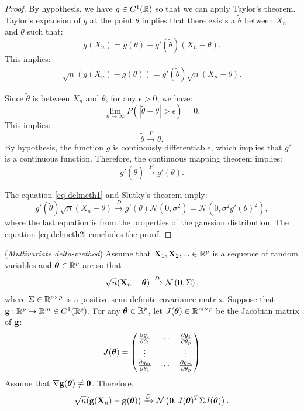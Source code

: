 \documentclass{article}
\begin{document}
\begin{proof}
By hypothesis, we have $g\in C^1(\mathbb{R})$ so that we can apply Taylor's theorem. 
Taylor's expansion of $g$ at the point $\theta$ implies that there exists a $\tilde{\theta}$ between 
$X_n$ and $\theta$ such that:
$$
g(X_n) = g(\theta) + g'\left(\tilde{\theta}\right)(X_n-\theta).
$$
This implies:
\begin{align}
\label{eq-delmeth2}
\sqrt{n} (g(X_n) - g(\theta)) = g'\left(\tilde{\theta}\right) \sqrt{n} (X_n-\theta).
\end{align}

Since $\tilde{\theta}$ is between $X_n$ and $\theta$, for any $\epsilon>0$, we have:
$$
\lim_{n\rightarrow \infty} P(|\tilde{\theta} - \theta|>\epsilon)=0.
$$
This implies:
$$
\tilde{\theta} \xrightarrow{P} \theta.
$$
By hypothesis, the function $g$ is continously differentiable, which implies that $g'$ is a 
continuous function. 
Therefore, the continuous mapping theorem implies:
$$
g'\left(\tilde{\theta}\right) \xrightarrow{P} g'(\theta).
$$

The equation \ref{eq-delmeth1} and Slutky's theorem imply:
$$
g'\left(\tilde{\theta}\right) \sqrt{n} (X_n-\theta) 
\xrightarrow{D} g'(\theta) \mathcal{N}(0,\sigma^2) = \mathcal{N}(0,\sigma^2 g'(\theta)^2),
$$
where the last equation is from the properties of the gaussian 
distribution. 
The equation \ref{eq-delmeth2} concludes the proof.
\end{proof}


\begin{theorem}
\label{eq-multivdelmeth1}
(\emph{Multivariate delta-method})
Assume that ${\bf X}_1,{\bf X}_2,... \in\mathbb{R}^p$ is a sequence of random variables 
and $\boldsymbol{\theta}\in\mathbb{R}^p$ are so that 
\begin{align}
\label{eq-multivdelmeth1}
\sqrt{n} ({\bf X}_n - \boldsymbol{\theta}) \xrightarrow{D} \mathcal{N}\left({\bf 0},\Sigma\right),
\end{align}
where $\Sigma\in\mathbb{R}^{p\times p}$ is a positive semi-definite covariance matrix. 
Suppose that ${\bf g}:\mathbb{R}^p \rightarrow \mathbb{R}^m \in C^1(\mathbb{R}^p)$. 
For any $\boldsymbol{\theta}\in\mathbb{R}^p$, let $J(\boldsymbol{\theta})\in\mathbb{R}^{m\times p}$ be the Jacobian matrix of ${\bf g}$:
$$
J(\boldsymbol{\theta}) = 
\begin{pmatrix}
\frac{\partial g_1}{\partial \theta_1} & 
\cdots &
\frac{\partial g_1}{\partial \theta_p} \\
\vdots &    & \vdots \\
\frac{\partial g_m}{\partial \theta_1} & 
\cdots &
\frac{\partial g_m}{\partial \theta_p} 
\end{pmatrix} 
$$
Assume that $\nabla {\bf g}(\boldsymbol{\theta})\neq {\bf 0}$. 
Therefore, 
$$
\sqrt{n} ({\bf g}({\bf X}_n) - {\bf g}(\boldsymbol{\theta})) \xrightarrow{D} \mathcal{N}\left({\bf 0}, J(\boldsymbol{\theta})^T \Sigma J(\boldsymbol{\theta})\right).
$$
\end{theorem}
\end{document}
